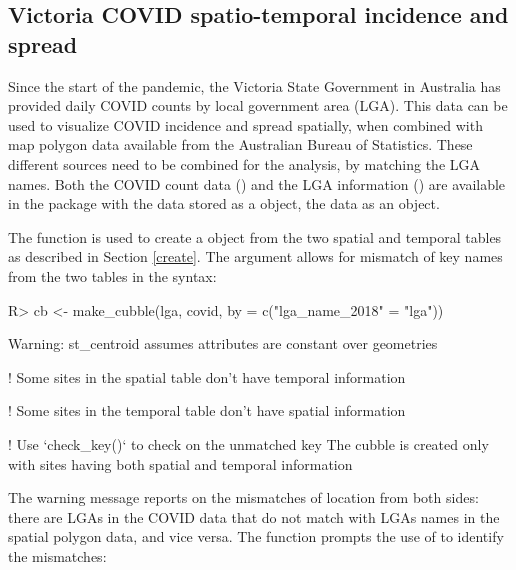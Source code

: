 \documentclass[
  shortnames]{jss}
\begin{document}
\hypertarget{covid}{%
\subsection{Victoria COVID spatio-temporal incidence and spread}\label{covid}}

Since the start of the pandemic, the Victoria State Government in Australia has provided daily COVID counts by local government area (LGA). This data can be used to visualize COVID incidence and spread spatially, when combined with map polygon data available from the Australian Bureau of Statistics. These different sources need to be combined for the analysis, by matching the LGA names. Both the COVID count data () and the LGA information () are available in the  package with the  data stored as a  object, the  data as an  object.

The  function is used to create a  object from the two spatial and temporal tables as described in Section \ref{create}. The  argument allows for mismatch of key names from the two tables in the   syntax:

\begin{CodeChunk}
\begin{CodeInput}
R> cb <- make_cubble(lga, covid, by = c("lga_name_2018" = "lga"))
\end{CodeInput}
\begin{CodeOutput}
Warning: st_centroid assumes attributes are constant over geometries
\end{CodeOutput}
\begin{CodeOutput}
! Some sites in the spatial table don't have temporal information
\end{CodeOutput}
\begin{CodeOutput}
! Some sites in the temporal table don't have spatial information
\end{CodeOutput}
\begin{CodeOutput}
! Use `check_key()` to check on the unmatched key
The cubble is created only with sites having both spatial and temporal information
\end{CodeOutput}
\end{CodeChunk}

The warning message reports on the mismatches of location from both sides: there are LGAs in the COVID data that do not match with LGAs names in the spatial polygon data, and vice versa. The  function prompts the use of  to identify the mismatches:
\end{document}
